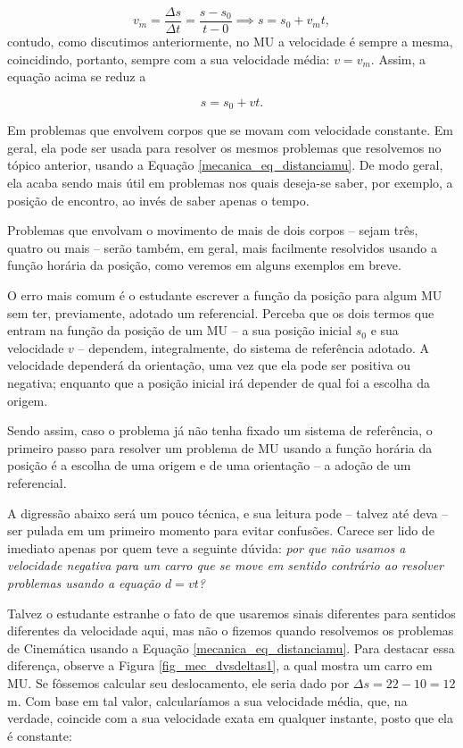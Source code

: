 $$ v_m = \dfrac{\Delta s}{\Delta t} = \dfrac{s-s_0}{t-0} \implies s = s_0 + v_mt,$$
contudo, como discutimos anteriormente, no MU a velocidade é sempre a mesma, coincidindo, portanto, sempre com a sua velocidade média: $v=v_m.$ Assim, a equação acima se reduz a

$$ \boxed{s=s_0+vt.}$$





Em problemas que envolvem corpos que se movam com velocidade constante. Em geral, ela pode ser usada para resolver os mesmos problemas que resolvemos no tópico anterior, usando a Equação \eqref{mecanica_eq_distanciamu}. De modo geral, ela acaba sendo mais útil em problemas nos quais deseja-se saber, por exemplo, a posição de encontro, ao invés de saber apenas o tempo.  

Problemas que envolvam o movimento de mais de dois corpos -- sejam três, quatro ou mais -- serão também, em geral, mais facilmente resolvidos usando a função horária da posição, como veremos em alguns exemplos em breve.


O erro mais comum é o estudante escrever a função da posição para algum MU sem ter, previamente, adotado um referencial. Perceba que os dois termos que entram na função da posição de um MU -- a sua posição inicial $s_0$ e sua velocidade $v$ -- dependem, integralmente, do sistema de referência adotado. A velocidade dependerá da orientação, uma vez que ela pode ser positiva ou negativa; enquanto que a posição inicial irá depender de qual foi a escolha da origem. 

Sendo assim, caso o problema já não tenha fixado um sistema de referência, o primeiro passo para resolver um problema de MU usando a função horária da posição é a escolha de uma origem e de uma orientação -- a adoção de um referencial.




A digressão abaixo será um pouco técnica, e sua leitura pode -- talvez até deva -- ser pulada em um primeiro momento para evitar confusões. Carece ser lido de imediato apenas por quem teve a seguinte dúvida: \textit{por que não usamos a velocidade negativa para um carro que se move em sentido contrário ao resolver problemas usando a equação $d=vt$?}

Talvez o estudante estranhe o fato de que usaremos sinais diferentes para sentidos diferentes da velocidade aqui, mas não o fizemos quando resolvemos os problemas de Cinemática usando a Equação \eqref{mecanica_eq_distanciamu}. Para destacar essa diferença, observe a Figura \ref{fig_mec_dvsdeltas1}, a qual mostra um carro em MU. Se fôssemos calcular seu deslocamento, ele seria dado por $\Delta s=22-10=12$m. Com base em tal valor, calcularíamos a sua velocidade média, que, na verdade, coincide com a sua velocidade exata em qualquer instante, posto que ela é constante:

